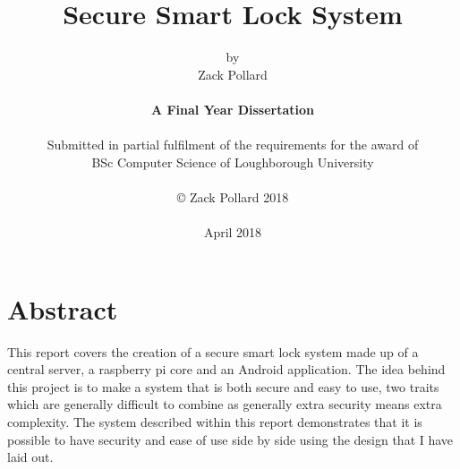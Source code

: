 
\title{Secure Smart Lock System}

\author{by\\Zack Pollard\\
\\
{\bf A Final Year Dissertation}\\
\\
Submitted in partial fulfilment of the requirements for the award of\\
BSc Computer Science of Loughborough University\\
\\
\copyright
\hspace{1 dd} Zack Pollard 2018\\
\\
April 2018
}
\date{} %





%
%

\chapter*{Abstract}

This report covers the creation of a secure smart lock system made up of a central server, a raspberry pi core and an Android application. The idea behind this project is to make a system that is both secure and easy to use, two traits which are generally difficult to combine as generally extra security means extra complexity. The system described within this report demonstrates that it is possible to have security and ease of use side by side using the design that I have laid out.

